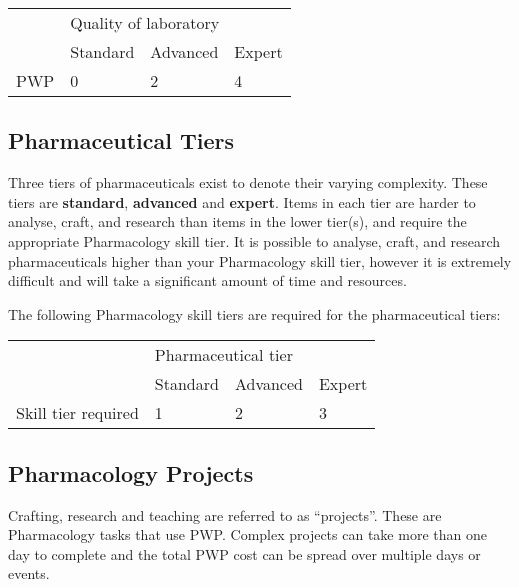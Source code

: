 \documentclass{scrbook}
\begin{document}
\begin{table}
\begin{tabular}{|l|l|l|l|} \hline 
\multirow{1}{*}{}& \multicolumn{3}{|l|}{Quality of laboratory} \\
\cline{2-2}\cline{3-3}\cline{4-4} & Standard & Advanced & Expert \\
 \hline PWP & 0 & 2 & 4 \\
 \hline \end{tabular}

\end{table}

\subsection{Pharmaceutical Tiers}

Three tiers of pharmaceuticals exist to denote their varying complexity. These tiers are \textbf{standard}, \textbf{advanced} and \textbf{expert}. Items in each tier are harder to analyse, craft, and research than items in the lower tier(s), and require the appropriate Pharmacology skill tier. It is possible to analyse, craft, and research pharmaceuticals higher than your Pharmacology skill tier, however it is extremely difficult and will take a significant amount of time and resources.

The following Pharmacology skill tiers are required for the pharmaceutical tiers:

\begin{table}
\begin{tabular}{|l|l|l|l|} \hline 
\multirow{1}{*}{}& \multicolumn{3}{|l|}{Pharmaceutical tier} \\
\cline{2-2}\cline{3-3}\cline{4-4} & Standard & Advanced & Expert \\
 \hline Skill tier required & 1 & 2 & 3 \\
 \hline \end{tabular}

\end{table}

\subsection{Pharmacology Projects}

Crafting, research and teaching are referred to as ``projects''. These are Pharmacology tasks that use PWP. Complex projects can take more than one day to complete and the total PWP cost can be spread over multiple days or events.
\end{document}
